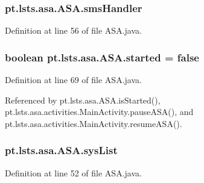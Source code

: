 \hypertarget{classpt_1_1lsts_1_1asa_1_1ASA_aa2a2cd288c2a2634632735baa0bf5a6b}{}
\subsubsection[{sms\+Handler}]{ pt.\+lsts.\+asa.\+A\+S\+A.\+sms\+Handler\hspace{0.3cm}{\ttfamily [static]}}\label{classpt_1_1lsts_1_1asa_1_1ASA_aa2a2cd288c2a2634632735baa0bf5a6b}


Definition at line 56 of file A\+S\+A.\+java.

\hypertarget{classpt_1_1lsts_1_1asa_1_1ASA_a6ed3c06b1580866836c2d0d39ae8c643}{}
\subsubsection[{started}]{\setlength{\rightskip}{0pt plus 5cm}boolean pt.\+lsts.\+asa.\+A\+S\+A.\+started = false}\label{classpt_1_1lsts_1_1asa_1_1ASA_a6ed3c06b1580866836c2d0d39ae8c643}


Definition at line 69 of file A\+S\+A.\+java.



Referenced by pt.\+lsts.\+asa.\+A\+S\+A.\+is\+Started(), pt.\+lsts.\+asa.\+activities.\+Main\+Activity.\+pause\+A\+S\+A(), and pt.\+lsts.\+asa.\+activities.\+Main\+Activity.\+resume\+A\+S\+A().

\hypertarget{classpt_1_1lsts_1_1asa_1_1ASA_a7d9323dbee5f882abe734625c536158b}{}
\subsubsection[{sys\+List}]{ pt.\+lsts.\+asa.\+A\+S\+A.\+sys\+List}\label{classpt_1_1lsts_1_1asa_1_1ASA_a7d9323dbee5f882abe734625c536158b}


Definition at line 52 of file A\+S\+A.\+java.



